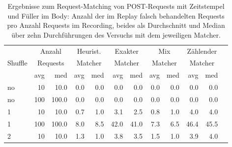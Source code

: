 \documentclass[12pt,a4paper]{report}
\begin{document}
\begin{table}[H]
	\centering
	\caption[Ergebnisse zum Request-Matching von POST-Requests]{
		Ergebnisse zum Request-Matching von POST-Requests mit Zeitstempel und Füller im Body:
		Anzahl der im Replay falsch behandelten Requests pro Anzahl Requests im Recording,
		beides als Durchschnitt und Median über zehn Durchführungen des Versuchs mit dem jeweiligen Matcher.
	}
	\label{tab:post}
	\begin{tabular}{|l|r|r|r|r|r|r|r|r|r|r|r|}
		\hline
		\multirow{3}{*}{Shuffle} & \multicolumn{2}{|c|}{Anzahl}   & \multicolumn{2}{|c|}{Heurist.} & \multicolumn{2}{|c|}{Exakter} & \multicolumn{2}{|c|}{Mix}     & \multicolumn{2}{|c|}{Zählender}                                    \\
		                         & \multicolumn{2}{|c|}{Requests} & \multicolumn{2}{|c|}{Matcher}  & \multicolumn{2}{|c|}{Matcher} & \multicolumn{2}{|c|}{Matcher} & \multicolumn{2}{|c|}{Matcher}                                      \\ \cline{2-11}
		                         & avg                            & med                            & avg                           & med                           & avg                             & med  & avg  & med  & avg  & med  \\ \hline
		no                       & 10                             & 10.0                           & 0.0                           & 0.0                           & 0.0                             & 0.0  & 0.0  & 0.0  & 0.0  & 0.0  \\ \hline
		no                       & 100                            & 100.0                          & 0.0                           & 0.0                           & 0.0                             & 0.0  & 0.0  & 0.0  & 0.0  & 0.0  \\ \hline
		1                        & 10                             & 10.0                           & 0.7                           & 1.0                           & 3.1                             & 2.5  & 0.8  & 1.0  & 4.0  & 4.0  \\ \hline
		1                        & 100                            & 100.0                          & 8.0                           & 8.5                           & 42.0                            & 41.0 & 7.3  & 6.5  & 46.4 & 45.5 \\ \hline
		2                        & 10                             & 10.0                           & 1.3                           & 1.0                           & 3.8                             & 3.5  & 1.5  & 1.0  & 3.9  & 4.0  \\ \hline

\end{tabular}
\end{table}
\end{document}
